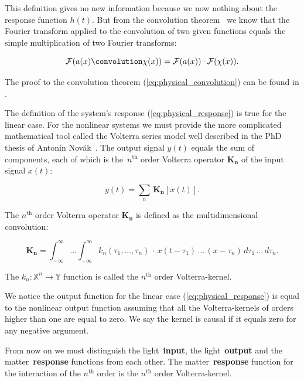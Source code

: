 \documentclass[12pt,twoside,a4paper]{article}
\numberwithin{equation}{subsection}
\numberwithin{figure}{subsection}
\begin{document}
This definition gives no new information because we now nothing about the response function $ h(t) $. But from the convolution
theorem~\cite{katznelson_introduction} we know that the Fourier transform applied to the convolution of two given functions equals the
simple multiplication of two Fourier transforms:

\begin{equation} \label{eq:physical_convolution}
  \mathcal{F}(a(x) \convolution \chi(x)) = \mathcal{F}(a(x)) \cdot \mathcal{F}(\chi(x)) .
\end{equation}

The proof to the convolution theorem (\ref{eq:physical_convolution}) can be found in \cite{titchmarsh_introduction}.

The definition of the system's response (\ref{eq:physical_response}) is true for the linear case. For the nonlinear systems we must provide
the more complicated mathematical tool called the Volterra series model well described in the PhD thesis of Antonín
Novák~\cite{thesis_novak}. The output signal $ y(t) $ equals the sum of components, each of which is the~$ n ^ {\text{th}} $ order Volterra
operator $ \mathbf{K_n} $ of the input signal $ x(t) $:

\begin{equation} \label{eq:physical_volterraseries}
  y(t) = \sum_{n} \, \mathbf{K_n}[x (t) ].
\end{equation}

The $ n ^ {\text{th}} $ order Volterra operator $ \mathbf{K_n} $ is defined as the multidimensional convolution:

\begin{equation} \label{eq:physical_volterraoperator}
  \mathbf{K_n} = \int_{ - \infty}^{\infty} \ldots \int_{ - \infty}^{\infty} k_n (\tau_1, \ldots, \tau_n) \, \cdot \, x(t - \tau_1) \, \ldots
  \, (x - \tau_n)\, d\tau_1 \, \ldots \, d\tau_n .
\end{equation}

The $ k_n : \mathbb{X}^{n} \rightarrow \mathbb{Y} $ function is called the $ n ^ {\text{th}} $ order Volterra-kernel. 

We notice the output function for the linear case (\ref{eq:physical_response}) is equal to the nonlinear output function assuming that all
the Volterra-kernels of orders higher than one are equal to zero. We say the kernel is causal if it equals zero for any negative
argument.

From now on we must distinguish the light~\textbf{input}, the light~\textbf{output} and the matter~\textbf{response} functions from each
other. The matter~\textbf{response} function for the interaction of the $ n^{\text{th}} $ order is the $ n^{\text{th}} $ order
Volterra-kernel.
\end{document}
